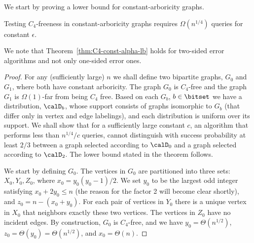 

We start by proving a lower bound for constant-arboricity graphs.
\begin{theorem} \label{thm:C4-const-alpha-lb}
Testing $C_4$-freeness in constant-arboricity graphs requires $\Omega(n^{1/4})$ queries for constant $\epsilon$.
\end{theorem}
We note that Theorem~\ref{thm:C4-const-alpha-lb} holds for two-sided error algorithms and not only one-sided error ones. 

\begin{proof}
For any (sufficiently large) $n$ we shall define two bipartite graphs, $G_0$ and $G_1$, where both have constant arboricity. The graph $G_0$ is $C_4$-free and  the graph $G_1$ is $\Omega(1)$-far from being $C_4$ free.
Based on each $G_b$, $b\in \bitset$ we have a distribution, $\calD_b$, whose support consists of graphs isomorphic to $G_b$ (that differ only in vertex and edge labelings), and each distribution is uniform over its support.
We shall show that for a sufficiently large constant $c$, an algorithm that performs less than $n^{1/4}/c$ queries, cannot distinguish with success probability at least $2/3$ between a graph selected according to $\calD_0$ and a graph selected according to $\calD_2$. The lower bound stated in the theorem follows.

We start by defining $G_0$. The vertices in $G_0$ are partitioned into three sets: $X_0,Y_0,Z_0$,  where $x_0 = y_0(y_0-1)/2$. We set $y_0$ to be the largest odd integer satisfying $x_0+2y_0 \leq n$ (the reason for the factor 2 will become clear shortly), and $z_0 = n-(x_0+y_0)$.
For each pair of vertices in $Y_0$ there is a unique vertex in $X_0$ that neighbors exactly these two vertices.
The vertices in $Z_0$ have no incident edges.
By construction, $G_0$ is $C_4$-free, and we have $y_0 = \Theta(n^{1/2})$, $z_0 = \Theta(y_0)=\Theta(n^{1/2})$,  and $x_0 = \Theta(n)$.


\end{proof}
